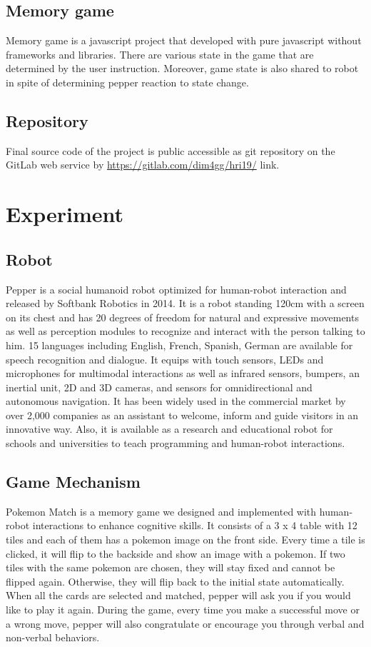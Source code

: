 \documentclass[12pt]{article}
\begin{document}
\subsection{Memory game}
Memory game is a javascript project that developed with pure javascript without frameworks and libraries. There are various state in the game that are determined by the user instruction. Moreover, game state is also shared to robot in spite of determining pepper reaction to state change.
\subsection{Repository}
Final source code of the project is public accessible as git repository on the GitLab web service by \url{https://gitlab.com/dim4gg/hri19/} link.
\newpage
\section{Experiment}
\label{sect_exper}

\subsection{Robot}
Pepper is a social humanoid robot optimized for human-robot interaction and released by Softbank Robotics in 2014. It is a robot standing 120cm with a screen on its chest and has 20 degrees of freedom for natural and expressive movements as well as perception modules to recognize and interact with the person talking to him. 15 languages including English, French, Spanish, German are available  for speech recognition and dialogue. It equips with touch sensors, LEDs and microphones for multimodal interactions as well as infrared sensors, bumpers, an inertial unit, 2D and 3D cameras, and sensors for omnidirectional and autonomous navigation. It has been widely used in the commercial market by over 2,000 companies as an assistant to welcome, inform and guide visitors in an innovative way. Also, it is available as a research and educational robot for schools and universities to teach programming and human-robot interactions. 

\subsection{Game Mechanism}
Pokemon Match is a memory game we designed and implemented with human-robot interactions to enhance cognitive skills. It consists of a 3 x 4 table with 12 tiles and each of them has a pokemon image on the front side. Every time a tile is clicked, it will flip to the backside and show an image with a pokemon. If two tiles with the same pokemon are chosen, they will stay fixed and cannot be flipped again. Otherwise, they will flip back to the initial state automatically. When all the cards are selected and matched, pepper will ask you if you would like to play it again. During the game, every time you make a successful move or a wrong move, pepper will also congratulate or encourage you through verbal and non-verbal behaviors.
\end{document}
